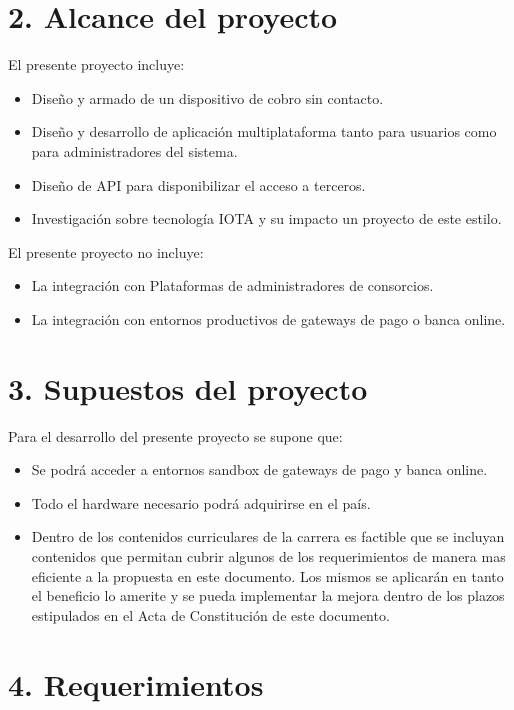 \documentclass[11pt]{charter}
\begin{document}
\section{2. Alcance del proyecto}
\label{sec:alcance}

El presente proyecto incluye: 
\begin{itemize}
		\item Diseño y armado de un dispositivo de cobro sin contacto.  
		\item Diseño y desarrollo de aplicación multiplataforma tanto para usuarios como para administradores del sistema. 
		\item Diseño de API para disponibilizar el acceso a terceros.
		\item Investigación sobre tecnología IOTA y su impacto un proyecto de este estilo.
\end{itemize}		
 El presente proyecto no incluye:
\begin{itemize}	
		\item La integración con Plataformas de administradores de consorcios.
		\item La integración con entornos productivos de gateways de pago o banca online. 		
\end{itemize}		 
\section{3. Supuestos del proyecto}
\label{sec:supuestos}
Para el desarrollo del presente proyecto se supone que:
\begin{itemize}
\item Se podrá acceder a entornos sandbox de gateways de pago y banca online.
\item Todo el hardware necesario podrá adquirirse en el país.
\item Dentro de los contenidos curriculares de la carrera es factible que se incluyan contenidos que permitan cubrir algunos de los requerimientos de manera mas eficiente a la propuesta en este documento. Los mismos se aplicarán en tanto el beneficio lo amerite y se pueda implementar la  mejora dentro de los plazos estipulados en el Acta de Constitución de este documento. 
\end{itemize}

\section{4. Requerimientos}
\label{sec:requerimientos}
\end{document}
